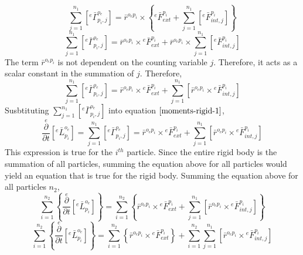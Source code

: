 \documentclass[class=report, 12pt, crop=false]{standalone}
\begin{document}
\begin{center}
$$\sum^{n_{1}}_{j = 1}\left[{}^{e}\bar{\Gamma}^{o_{e}}_{p_{i},j}\right] = \bar{r}^{o_{e}p_{i}}\times\left\{{}^{e}\bar{F}^{p_{i}}_{ext} + \sum^{n_{1}}_{j = 1}\left[{}^{e}\bar{F}^{p_{i}}_{int,j}\right]\right\}$$
$$\sum^{n_{1}}_{j = 1}\left[{}^{e}\bar{\Gamma}^{o_{e}}_{p_{i},j}\right] =  \bar{r}^{o_{e}p_{i}}\times{}^{e}\bar{F}^{p_{i}}_{ext} + \bar{r}^{o_{e}p_{i}}\times\sum^{n_{1}}_{j = 1}\left[{}^{e}\bar{F}^{p_{i}}_{int,j}\right]$$
The term $\bar{r}^{o_{e}p_{i}}$ is not dependent on the counting variable $j$. Therefore, it acts as a scalar constant in the summation of $j$. Therefore,
$$\sum^{n_{1}}_{j = 1}\left[{}^{e}\bar{\Gamma}^{o_{e}}_{p_{i},j}\right] = \bar{r}^{o_{e}p_{i}}\times{}^{e}\bar{F}^{p_{i}}_{ext} + \sum^{n_{1}}_{j = 1}\left[\bar{r}^{o_{e}p_{i}}\times{}^{e}\bar{F}^{p_{i}}_{int,j}\right]$$
Susbtituting $\displaystyle \sum^{n_{1}}_{j = 1}\left[{}^{e}\bar{\Gamma}^{o_{e}}_{p_{i},j}\right]$ into equation $\ref{moments-rigid-1}$,
$$\overset{e}{\frac{\partial}{\partial t}}\left[{}^{e}\bar{L}^{o_{e}}_{p_{i}}\right] = \sum^{n_{1}}_{j = 1}\left[{}^{e}\bar{\Gamma}^{o_{e}}_{p_{i},j}\right] = \bar{r}^{o_{e}p_{i}}\times{}^{e}\bar{F}^{p_{i}}_{ext} + \sum^{n_{1}}_{j = 1}\left[\bar{r}^{o_{e}p_{i}}\times{}^{e}\bar{F}^{p_{i}}_{int,j}\right]$$
This expression is true for the $i^{th}$ particle. Since the entire rigid body is the summation of all particles, summing the equation above for all particles would yield an equation that is true for the rigid body. Summing the equation above for all particles $n_{2}$,
$$\sum^{n_{2}}_{i = 1}\left\{ \overset{e}{\frac{\partial}{\partial t}}\left[{}^{e}\bar{L}^{o_{e}}_{p_{i}}\right]\right\} = \sum^{n_{2}}_{i = 1}\left\{ \bar{r}^{o_{e}p_{i}}\times{}^{e}\bar{F}^{p_{i}}_{ext} + \sum^{n_{1}}_{j = 1}\left[\bar{r}^{o_{e}p_{i}}\times{}^{e}\bar{F}^{p_{i}}_{int,j}\right]\right\}$$
$$\sum^{n_{2}}_{i = 1}\left\{ \overset{e}{\frac{\partial}{\partial t}}\left[{}^{e}\bar{L}^{o_{e}}_{p_{i}}\right]\right\} = \sum^{n_{2}}_{i = 1}\left\{ \bar{r}^{o_{e}p_{i}}\times{}^{e}\bar{F}^{p_{i}}_{ext}\right\} + \sum^{n_{2}}_{i = 1}  \sum^{n_{1}}_{j = 1}\left[\bar{r}^{o_{e}p_{i}}\times{}^{e}\bar{F}^{p_{i}}_{int,j}\right] $$


\end{center}
\end{document}
